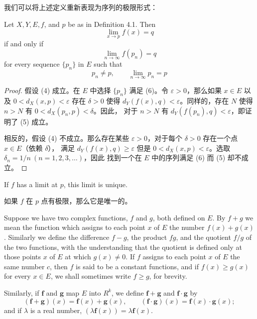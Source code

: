 \documentclass[../poma-notes.tex]{subfiles}
\begin{document}
\newpage
我们可以将上述定义重新表现为序列的极限形式：

\begin{theorem}
  Let $X, Y, E, f$, and $p$ be as in Definition 4.1. Then
  \begin{equation}
    \lim_{x \to p} f(x) = q
  \end{equation}
  if and only if
  \begin{equation}
    \lim_{n \to \infty} f(p_n) = q
  \end{equation}
  for every sequence $\{p_n\}$ in $E$ such that
  \begin{equation}
    p_n \ne p, \qquad \lim_{n \to \infty} p_n = p
  \end{equation}
\end{theorem}

\begin{proof}
  假设 (4) 成立。在 $E$ 中选择 $\{p_n\}$ 满足 (6)。令 $\varepsilon > 0$，那么如果 $x\in E$ 以及 $0<d_X(x,p)<\varepsilon$
  存在 $\delta > 0$ 使得 $d_Y(f(x),q)<\varepsilon$。同样的，存在 $N$ 使得 $n > N$ 有 $0<d_X(p_n,p)<\delta$。因此，
  对于 $n > N$ 有 $d_Y(f(p_n),q) < \varepsilon$，即证明了 (5) 成立。

  相反的，假设 (4) 不成立。那么存在某些 $\varepsilon > 0$，对于每个 $\delta > 0$ 存在一个点 $x \in E$（依赖 $\delta$），
  满足 $d_Y(f(x),q)\ge\varepsilon$ 但是 $0<d_X(x,p)<\varepsilon$。选取 $\delta_n = 1/n\ (n=1,2,3,\dots)$，因此
  找到一个在 $E$ 中的序列满足 (6) 而 (5) 却不成立。
\end{proof}

\begin{corollary}
  If $f$ has a limit at $p$, this limit is unique.
\end{corollary}

\begin{anote}
  如果 $f$ 在 $p$ 点有极限，那么它是唯一的。
\end{anote}

\begin{definition}
  Suppose we have two complex functions, $f$ and $g$, both defined on $E$. By $f + g$ we mean the function which
  assigns to each point $x$ of $E$ the number $f(x) + g(x)$. Similarly we define the difference $f - g$, the
  product $fg$, and the quotient $f/g$ of the two functions, with the understanding that the quotient is defined
  only at those points $x$ of $E$ at which $g(x) \ne 0$. If $f$ assigns to each point $x$ of $E$ the same number
  $c$, then $f$ is said to be a constant functions, and if $f(x) \ge g(x)$ for every $x \in E$, we shall sometimes
  write $f \ge g$, for brevity.

  Similarly, if $\mathbf{f}$ and $\mathbf{g}$ map $E$ into $R^k$, we define $\mathbf{f}+\mathbf{g}$ and
  $\mathbf{f}\cdot\mathbf{g}$ by
  \[
    (\mathbf{f}+\mathbf{g})(x)=\mathbf{f}(x)+\mathbf{g}(x),\qquad
    (\mathbf{f}\cdot\mathbf{g})(x)=\mathbf{f}(x)\cdot\mathbf{g}(x);
  \]
  and if $\lambda$ is a real number, $(\lambda\mathbf{f}(x))=\lambda\mathbf{f}(x)$.
\end{definition}
\end{document}
